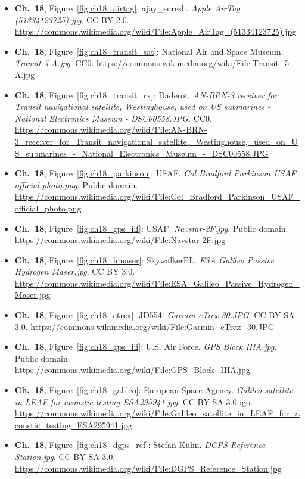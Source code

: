 \begin{small}
\begin{itemize}[leftmargin=0pt,itemsep=2pt,label={}]
\item \textbf{Ch.~18}, Figure~\ref{fig:ch18_airtag}: ajay\_suresh. \emph{Apple AirTag (51334123725).\allowbreak{}jpg}. CC BY 2.0. \url{https://commons.wikimedia.org/wiki/File:Apple_AirTag_(51334123725).jpg}
\item \textbf{Ch.~18}, Figure~\ref{fig:ch18_transit_sat}: National Air and Space Museum. \emph{Transit 5-\allowbreak{}A.\allowbreak{}jpg}. CC0. \url{https://commons.wikimedia.org/wiki/File:Transit_5-A.jpg}
\item \textbf{Ch.~18}, Figure~\ref{fig:ch18_transit_rx}: Daderot. \emph{AN-\allowbreak{}BRN-\allowbreak{}3 receiver for Transit navigational satellite, Westinghouse, used on US submarines -\allowbreak{} National Electronics Museum -\allowbreak{} DSC00558.\allowbreak{}JPG}. CC0. \url{https://commons.wikimedia.org/wiki/File:AN-BRN-3_receiver_for_Transit_navigational_satellite,_Westinghouse,_used_on_US_submarines_-_National_Electronics_Museum_-_DSC00558.JPG}
\item \textbf{Ch.~18}, Figure~\ref{fig:ch18_parkinson}: USAF. \emph{Col Bradford Parkinson USAF official photo.\allowbreak{}png}. Public domain. \url{https://commons.wikimedia.org/wiki/File:Col_Bradford_Parkinson_USAF_official_photo.png}
\item \textbf{Ch.~18}, Figure~\ref{fig:ch18_gps_iif}: USAF. \emph{Navstar-\allowbreak{}2F.\allowbreak{}jpg}. Public domain. \url{https://commons.wikimedia.org/wiki/File:Navstar-2F.jpg}
\item \textbf{Ch.~18}, Figure~\ref{fig:ch18_hmaser}: SkywalkerPL. \emph{ESA Galileo Passive Hydrogen Maser.\allowbreak{}jpg}. CC BY 3.0. \url{https://commons.wikimedia.org/wiki/File:ESA_Galileo_Passive_Hydrogen_Maser.jpg}
\item \textbf{Ch.~18}, Figure~\ref{fig:ch18_etrex}: JD554. \emph{Garmin eTrex 30.\allowbreak{}JPG}. CC BY-SA 3.0. \url{https://commons.wikimedia.org/wiki/File:Garmin_eTrex_30.JPG}
\item \textbf{Ch.~18}, Figure~\ref{fig:ch18_gps_iii}: U.S. Air Force. \emph{GPS Block IIIA.\allowbreak{}jpg}. Public domain. \url{https://commons.wikimedia.org/wiki/File:GPS_Block_IIIA.jpg}
\item \textbf{Ch.~18}, Figure~\ref{fig:ch18_galileo}: European Space Agency. \emph{Galileo satellite in LEAF for acoustic testing ESA295941.\allowbreak{}jpg}. CC BY-SA 3.0 igo. \url{https://commons.wikimedia.org/wiki/File:Galileo_satellite_in_LEAF_for_acoustic_testing_ESA295941.jpg}
\item \textbf{Ch.~18}, Figure~\ref{fig:ch18_dgps_ref}: Stefan Kühn. \emph{DGPS Reference Station.\allowbreak{}jpg}. CC BY-SA 3.0. \url{https://commons.wikimedia.org/wiki/File:DGPS_Reference_Station.jpg}

\end{itemize}
\end{small}
